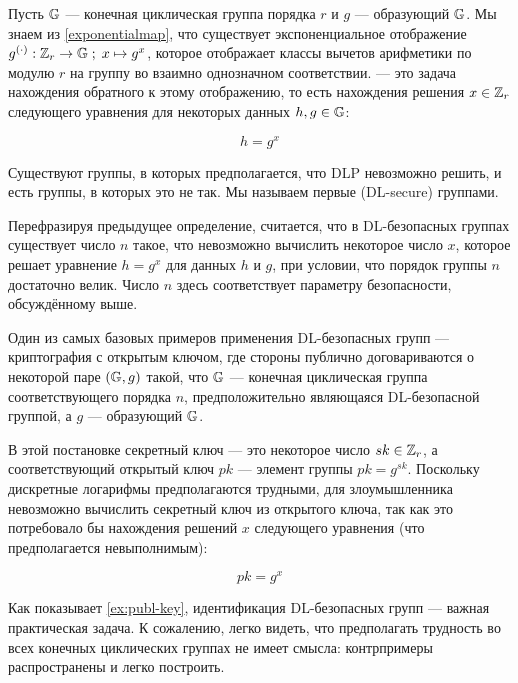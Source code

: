 \begin{definition}[]
Пусть $\mathbb{G}$ — конечная циклическая группа порядка $r$ и $g$ — образующий $\mathbb{G}$. Мы знаем из \eqref{exponentialmap}, что существует экспоненциальное отображение $g^{(\cdot)}: \mathbb{Z}_r \to \mathbb{G}\; ;\; x\mapsto g^x$, которое отображает классы вычетов арифметики по модулю $r$ на группу во взаимно однозначном соответствии.
\textbf{} — это задача нахождения обратного к этому отображению, то есть нахождения решения $x\in\mathbb{Z}_r$ следующего уравнения для некоторых данных $h, g \in \mathbb{G}$:

\begin{equation}
h = g^x
\end{equation}
\end{definition}

Существуют группы, в которых предполагается, что DLP невозможно решить, и есть группы, в которых это не так. Мы называем первые  (DL-secure) группами.

Перефразируя предыдущее определение, считается, что в DL-безопасных группах существует число $n$ такое, что невозможно вычислить некоторое число $x$, которое решает уравнение $h=g^x$ для данных $h$ и $g$, при условии, что порядок группы $n$ достаточно велик. Число $n$ здесь соответствует параметру безопасности, обсуждённому выше.

\begin{example}\label{ex:publ-key}

Один из самых базовых примеров применения DL-безопасных групп — криптография с открытым ключом, где стороны публично договариваются о некоторой паре $(\mathbb{G},g)$ такой, что $\mathbb{G}$ — конечная циклическая группа соответствующего порядка $n$, предположительно являющаяся DL-безопасной группой, а $g$ — образующий $\mathbb{G}$.

В этой постановке секретный ключ — это некоторое число $sk \in \mathbb{Z}_r$, а соответствующий открытый ключ $pk$ — элемент группы $pk=g^{sk}$. Поскольку дискретные логарифмы предполагаются трудными, для злоумышленника невозможно вычислить секретный ключ из открытого ключа, так как это потребовало бы нахождения решений $x$ следующего уравнения (что предполагается невыполнимым):

\begin{equation}
pk = g^{x}
\end{equation}

\end{example}

Как показывает \examplename{} \ref{ex:publ-key}, идентификация DL-безопасных групп — важная практическая задача. К сожалению, легко видеть, что предполагать трудность  во всех конечных циклических группах не имеет смысла: контрпримеры распространены и легко построить.

